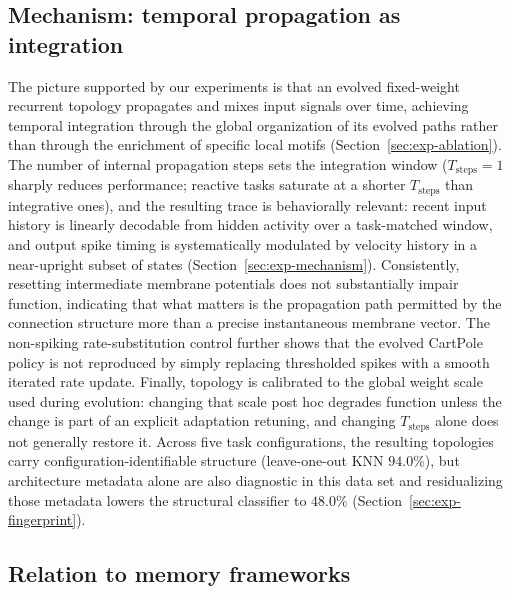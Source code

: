 \documentclass[10pt]{article}
\begin{document}
\subsection{Mechanism: temporal propagation as integration}

The picture supported by our experiments is that an evolved fixed-weight recurrent
topology propagates and mixes input signals over time, achieving temporal
integration through the global organization of its evolved paths rather than
through the enrichment of specific local motifs (Section~\ref{sec:exp-ablation}).
The number of internal propagation steps sets the integration window
($T_\text{steps}=1$ sharply reduces performance; reactive tasks saturate at a
shorter $T_\text{steps}$ than integrative ones), and the resulting trace is
behaviorally relevant: recent input history is linearly decodable from hidden
activity over a task-matched window, and output spike timing is systematically
modulated by velocity history in a near-upright subset of states
(Section~\ref{sec:exp-mechanism}). Consistently, resetting intermediate membrane
potentials does not substantially impair function, indicating that what matters is the
propagation path permitted by the connection structure more than a precise
instantaneous membrane vector. The non-spiking rate-substitution control further shows that
the evolved CartPole policy is not reproduced by simply replacing thresholded
spikes with a smooth iterated rate update. Finally, topology is calibrated to the
global weight scale used during evolution: changing that scale post hoc degrades
function unless the change is part of an explicit adaptation retuning, and
changing $T_\text{steps}$ alone does not generally restore it. Across five task
configurations, the resulting topologies carry configuration-identifiable
structure (leave-one-out KNN $94.0\%$), but architecture metadata alone are also
diagnostic in this data set and residualizing those metadata lowers the
structural classifier to $48.0\%$ (Section~\ref{sec:exp-fingerprint}).

\subsection{Relation to memory frameworks}
\end{document}
